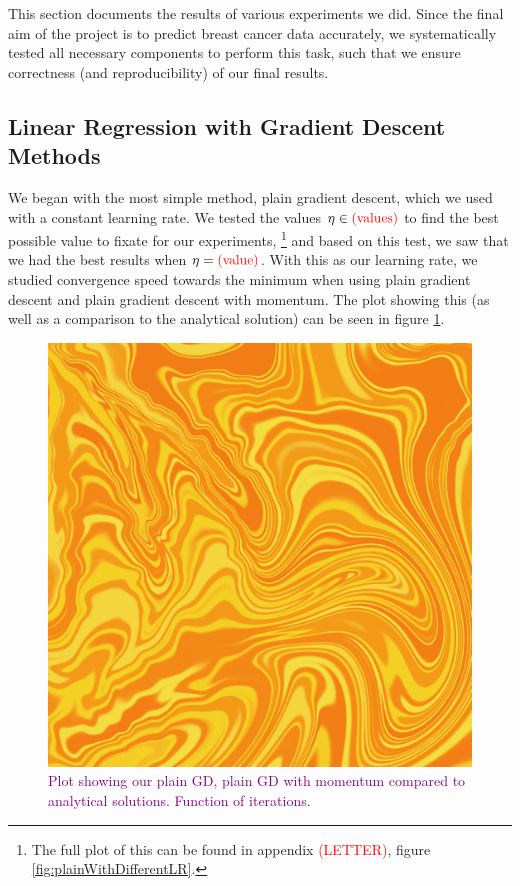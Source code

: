 This section documents the results of various experiments we did. Since the final aim of the
project is to predict breast cancer data accurately, we systematically tested all necessary components to perform this task, such that we ensure correctness (and reproducibility) of our final results.

\subsection{Linear Regression with Gradient Descent Methods}
We began with the most simple method, plain gradient descent, which we used with a constant learning rate. We tested the values $\eta \in \text{\textcolor{red}{(values)}}$ to find the best possible value to fixate for our experiments, \footnote{The full plot of this can be found in appendix \textcolor{red}{(LETTER)}, figure \ref{fig:plainWithDifferentLR}.} and based on this test, we saw that we had the best results when $\eta = \text{\textcolor{red}{(value)}}$. With this as our learning rate, we studied convergence speed towards the minimum when using plain gradient descent and plain gradient descent with momentum. The plot showing this (as well as a comparison to the analytical solution) can be seen in figure \ref{fig:plainVSanalytical}.
\begin{figure}
    \centering
    \includegraphics[width=0.5\linewidth]{figures/placeholders/plainVSanalytical.png}
    \caption{\textcolor{purple}{Plot showing our plain GD, plain GD with momentum compared to analytical solutions. Function of iterations.}}
    \label{fig:plainVSanalytical}
\end{figure}

